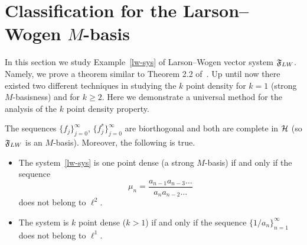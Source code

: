 \section{Classification for the Larson--Wogen $M$-basis}
  \label{section:lw-sys}
  In this section we study Example~\eqref{lw-sys} of Larson--Wogen vector system $\fsys_{LW}$.
  Namely, we prove a theorem similar to Theorem 2.2 of~\cite{katavolos}.
  Up until now there existed two different techniques in studying the $k$ point density for $k=1$ (strong $M$-basisness) and for $k\geq2$.
  Here we demonstrate a universal method for the analysis of the $k$ point density property.
  \begin{theorem}
    \label{thm:katavolos}
    The sequences $\{f_j\}_{j=0}^\infty$, $\{f^*_j\}_{j=0}^\infty$ are biorthogonal
      and both are complete in $\cal{H}$ (so $\fsys_{LW}$ is an $M$-basis).
    Moreover, the following is true.
    \begin{itemize}
      \item  The system~\eqref{lw-sys} is one point dense (a strong $M$-basis) if and only if the sequence
        \begin{equation}
          \mu_n = \frac{a_{n-1} a_{n-3} \dots}{a_{n} a_{n-2} \dots }
        \end{equation}
        does not belong to $\ell^2$.
      \item The system is $k$ point dense ($k > 1$) if and only if the sequence $\{1/a_n\}_{n=1}^\infty$ does not belong to $\ell^1$.
    \end{itemize}
  \end{theorem}
